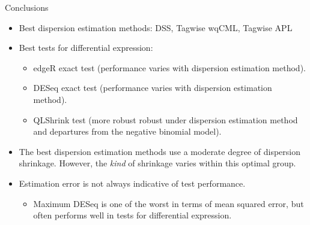 \documentclass{beamer}
\begin{document}
\begin{frame}
\begin{columns}[t]
\begin{column}{.33\linewidth}
\begin{block}{Conclusions}
\begin{itemize}
\item Best dispersion estimation methods: DSS, Tagwise wqCML, Tagwise APL
\item Best tests for differential expression:
\begin{itemize}
\item edgeR exact test (performance varies with dispersion estimation method).
\item DESeq exact test (performance varies with dispersion estimation method).
\item QLShrink test (more robust robust under dispersion estimation method and departures from the negative binomial model).
\end{itemize}

\item The best dispersion estimation methods use a moderate degree of dispersion shrinkage. However, the \emph{kind} of shrinkage varies within this optimal group.
\item Estimation error is not always indicative of test performance. 
\begin{itemize}
\item Maximum DESeq is one of the worst in terms of mean squared error, but often performs well in tests for differential expression.
\end{itemize}

\end{itemize}
\end{block}    
    


\end{column}

\end{columns}
\end{frame}
\end{document}
